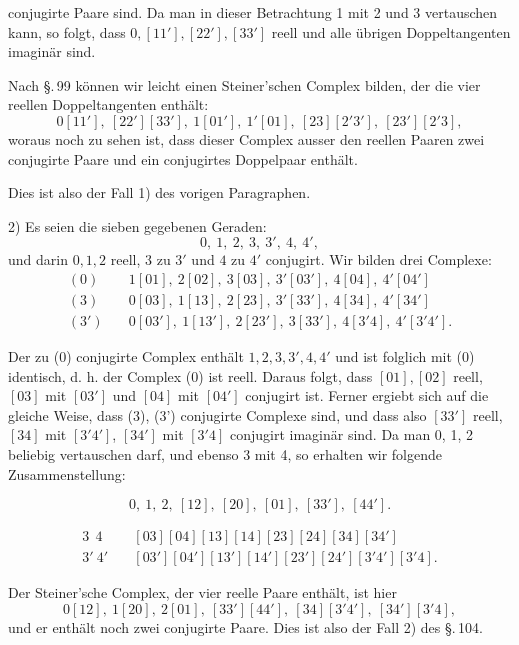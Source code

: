conjugirte Paare sind. Da man in dieser Betrachtung 1 mit 2
und 3 vertauschen kann, so folgt, dass $0, [11'], [22'], [33']$
reell und alle übrigen Doppeltangenten imaginär sind.

Nach \S.\,99 können wir leicht einen Steiner'schen Complex
bilden, der die vier reellen Doppeltangenten enthält:
\[
0[11'],\ [22'][33'],\ 1[01'],\ 1'[01],\ [23][2'3'],\ [23'][2'3],
\]
woraus noch zu sehen ist, dass dieser Complex ausser den reellen
Paaren zwei conjugirte Paare und ein conjugirtes Doppelpaar
enthält.

Dies ist also der Fall 1) des vorigen Paragraphen.

2) Es seien die sieben gegebenen Geraden:
\[
0,\ 1,\ 2,\ 3,\ 3',\ 4,\ 4',
\]
und darin $0, 1, 2$ reell, $3$ zu $3'$ und $4$ zu $4'$ conjugirt. Wir
bilden drei Complexe:
\[
\begin{aligned}
(0)&\quad 1[01],\ 2[02],\ 3[03],\ 3'[03'],\ 4[04],\ 4'[04']\\
(3)&\quad 0[03],\ 1[13],\ 2[23],\ 3'[33'],\ 4[34],\ 4'[34']\\
(3')&\quad 0[03'],\ 1[13'],\ 2[23'],\ 3[33'],\ 4[3'4],\ 4'[3'4'].
\end{aligned}
\]

Der zu (0) conjugirte Complex enthält $1, 2, 3, 3', 4, 4'$ und
ist folglich mit (0) identisch, d. h. der Complex (0) ist reell.
Daraus folgt, dass $[01], [02]$ reell, $[03]$ mit $[03']$ und $[04]$
mit $[04']$ conjugirt ist. Ferner ergiebt sich auf die gleiche
Weise, dass (3), (3') conjugirte Complexe sind, und dass also
$[33']$ reell, $[34]$ mit $[3'4']$, $[34']$ mit $[3'4]$ conjugirt imaginär
sind. Da man 0, 1, 2 beliebig vertauschen darf, und ebenso 3
mit 4, so erhalten wir folgende Zusammenstellung:

\begin{center}
\end{center}
\[
0,\ 1,\ 2,\ [12],\ [20],\ [01],\ [33'],\ [44'].
\]

\begin{center}
\end{center}
\[
\begin{aligned}
3\ \ 4 &\quad [03][04][13][14][23][24][34][34']\\
3'\ 4' &\quad [03'][04'][13'][14'][23'][24'][3'4'][3'4].
\end{aligned}
\]

Der Steiner'sche Complex, der vier reelle Paare enthält,
ist hier
\[
0[12],\ 1[20],\ 2[01],\ [33'][44'],\ [34][3'4'],\ [34'][3'4],
\]
und er enthält noch zwei conjugirte Paare. Dies ist also der
Fall 2) des \S.\,104.
